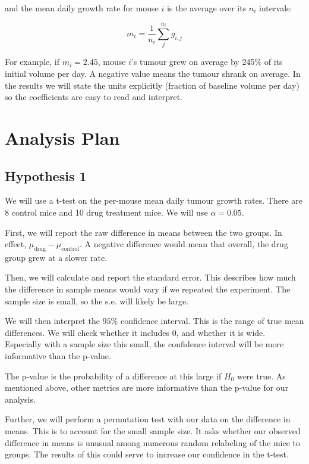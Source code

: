 \documentclass[12pt]{article}\usepackage[]{graphicx}\usepackage[]{xcolor}
\begin{document}
and the mean daily growth rate for mouse $i$ is the average over its $n_i$ intervals:

\begin{equation*}
m_i = \frac{1}{n_i} \sum_{j}^{n_i} g_{i,j}
\end{equation*}

For example, if $m_i = 2.45$, mouse $i$'s tumour grew on average by 245\% of its initial volume per day. A negative value means the tumour shrank on average. In the results we will state the units explicitly (fraction of baseline volume per day) so the coefficients are easy to read and interpret.

\section{Analysis Plan}

\subsection{Hypothesis 1}

We will use a t-test on the per-mouse mean daily tumour growth rates. There are 8 control mice and 10 drug treatment mice. We will use $\alpha=0.05$. 

First, we will report the raw difference in means between the two groups. In effect, $\mu_{\text{drug}} - \mu_{\text{control}}$. A negative difference would mean that overall, the drug group grew at a slower rate.

Then, we will calculate and report the standard error. 
This describes how much the difference in sample means would vary if we repeated the experiment. The sample size is small, so the s.e. will likely be large.

We will then interpret the $95\%$ confidence interval. This is the range of true mean differences. We will check whether it includes 0, and whether it is wide. Especially with a sample size this small, the confidence interval will be more informative than the p-value. 

The p-value is the probability of a difference at this large if $H_0$ were true. As mentioned above, other metrics are more informative than the p-value for our analysis. 

Further, we will perform a permutation test with our data on the difference in means. This is to account for the small sample size. It asks whether our observed difference in means is unusual among numerous random relabeling of the mice to groups. The results of this could serve to increase our confidence in the t-test. 
\end{document}
